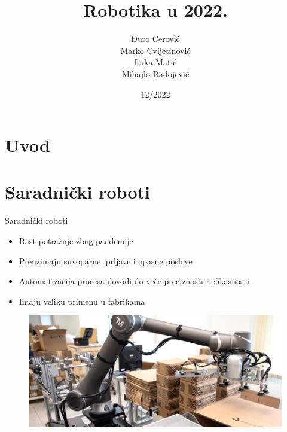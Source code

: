 \documentclass{beamer}
\title{Robotika u 2022.}
\subtitle{}
\institute[Tehničko i naučno pisanje]{Matematički fakultet\\Univerziteta u Beogradu}
\author[]{Đuro Cerović\\Marko Cvijetinović\\Luka Matić\\Mihajlo Radojević}
\date{12/2022}
\begin{document}
\begin{frame}
\titlepage
\end{frame}


\section{Uvod}


\section{Saradnički roboti}
\begin{frame}{Saradnički roboti}
    \begin{itemize}
        \item Rast potražnje zbog pandemije
        \item Preuzimaju suvoparne, prljave i opasne poslove
        \item Automatizacija procesa dovodi do veće preciznosti i efikasnosti 
        \item Imaju veliku primenu u fabrikama 
    \end{itemize}
    \begin{figure}
        \centering
        \includegraphics[scale=0.25]{Cobot.jpg}
    \end{figure}
\end{frame}
\end{document}
